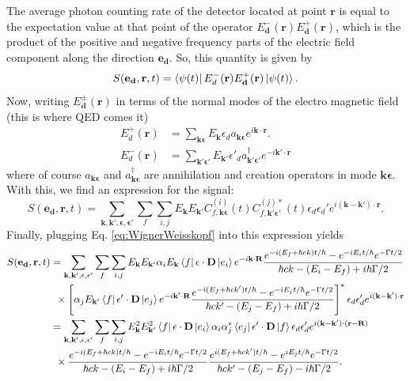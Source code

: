 \documentclass[11pt]{article}
\newcommand{\al}{\alpha}
\newcommand{\f}[2]{\frac{#1}{#2}}
\newcommand{\lb}{\left[}
\newcommand{\rb}{\right]}
\begin{document}
The average photon counting rate of the detector located at point $\mathbf{r}$ is equal to the expectation value at that point of the operator $E^-_\mathbf{d}(\mathbf{r}) E^+_\mathbf{d}(\mathbf{r})$, which is the product of the positive and negative frequency parts of the electric field component along the direction $\mathbf{e_d}$. So, this quantity is given by 
\begin{equation*}
S(\mathbf{e_d}, \mathbf{r},t) = \bra{\psi(t)} E_d^-(\mathbf{r}) E_\mathbf{d}^+(\mathbf{r}) \ket{\psi(t)}.
\end{equation*}
Now, writing $E_\mathbf{d}^{\pm}(\mathbf{r})$ in terms of the normal modes of the electro magnetic field (this is where QED comes it)
\begin{align*}
E_d^+(\mathbf{r}) &= \sum_{\mathbf{k\epsilon}} E_\mathbf{k} \epsilon_d a_{\mathbf{k\epsilon}} e^{i\mathbf{k}\cdot \mathbf{r}}. \\
E_d^-(\mathbf{r}) &= \sum_{\mathbf{k'\epsilon'}} E_{\mathbf{k'}} \epsilon'_d a^\dagger_{\mathbf{k'\epsilon'}} e^{-i\mathbf{k'}\cdot \mathbf{r}}
\end{align*}
where of course $a_{\mathbf{k\epsilon}}$ and $a^\dagger_{\mathbf{k\epsilon}}$ are annihilation and creation operators in mode $\mathbf{k\epsilon}$. With this, we find an expression for the signal:
\begin{equation*}
S(\mathbf{e_d}, \mathbf{r},t) = \sum_{\mathbf{k,k',\epsilon,\epsilon'}}\sum_f \sum_{i,j} E_\mathbf{k} E_{\mathbf{k'}} C_{f,\mathbf{k\epsilon}}^{(i)}(t) C_{f,\mathbf{k'\epsilon'}}^{(j)*}(t) \epsilon_d \epsilon_d' e^{i(\mathbf{k-k'})\cdot \mathbf{r}}.
\end{equation*}
Finally, plugging Eq. \ref{eq:WignerWeisskopf} into this expression yields
\begin{align}
S(\mathbf{e_d}, \mathbf{r},t) 
&= \sum_{\mathbf{k,k',\epsilon,\epsilon'}}\sum_f \sum_{i,j} 
E_\mathbf{k} E_{\mathbf{k'}} \al_i E_\mathbf{k} \bra{f} \mathbf{\epsilon}\cdot \mathbf{D} \ket{e_i} e^{-i\mathbf{k}\cdot \mathbf{R}} \f{e^{-i(E_f + \hbar c k)t/\hbar}  -e^{-iE_i t/\hbar}e^{-\Gamma t / 2}  }{\hbar c k - (E_i - E_f) + i\hbar \Gamma/2}\nonumber\\
&\,\,\,\times  \lb \al_j E_\mathbf{k'} \bra{f} \mathbf{\epsilon'}\cdot \mathbf{D} \ket{e_j} e^{-i\mathbf{k'}\cdot \mathbf{R}} \f{e^{-i(E_f + \hbar c k')t/\hbar}  -e^{-iE_j t/\hbar}e^{-\Gamma t / 2}  }{\hbar c k' - (E_j - E_f) + i\hbar \Gamma/2}\rb^* \epsilon_d \epsilon_d' e^{i(\mathbf{k-k'})\cdot \mathbf{r}}\nonumber\\
&= \sum_{\mathbf{k,k',\epsilon,\epsilon'}}\sum_f \sum_{i,j} 
E_\mathbf{k}^2 E_{\mathbf{k'}}^2  \bra{f} \mathbf{\epsilon}\cdot \mathbf{D} \ket{e_i}  \al_i\al_j^*  \bra{e_j} \mathbf{\epsilon'}\cdot \mathbf{D} \ket{f}  \epsilon_d \epsilon_d' e^{i(\mathbf{k-k'})\cdot (\mathbf{r} - \mathbf{R}  )}
\nonumber\\
&\,\,\,\times  
\f{e^{-i(E_f + \hbar c k)t/\hbar}  -e^{-iE_i t/\hbar}e^{-\Gamma t / 2}  }{\hbar c k - (E_i - E_f) + i\hbar \Gamma/2}
\f{e^{i(E_f + \hbar c k')t/\hbar}  - e^{iE_j t/\hbar}e^{-\Gamma t / 2}  }{\hbar c k' - (E_j - E_f) - i\hbar \Gamma/2}\nonumber.
\end{align}
\end{document}
